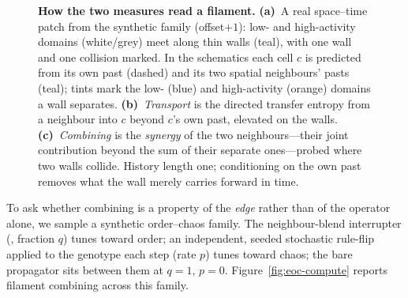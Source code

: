 \documentclass[man,12pt,floatsintext,donotrepeattitle]{apa7}
\newcommand{\secref}[1]{\emph{\nameref{#1}}}
\begin{document}
\begin{figure}[tb]
\caption{\textbf{How the two measures read a filament.} \textbf{(a)}~A real
space--time patch from the synthetic family (offset$+1$): low- and high-activity
domains (white/grey) meet along thin walls (teal), with one wall and one collision
marked. In the schematics each cell $c$ is predicted from its own past (dashed)
and its two spatial neighbours' pasts (teal); tints mark the low- (blue) and
high-activity (orange) domains a wall separates. \textbf{(b)}~\emph{Transport} is
the directed transfer entropy from a neighbour into $c$ beyond $c$'s own past,
elevated on the walls. \textbf{(c)}~\emph{Combining} is the \emph{synergy} of the
two neighbours---their joint contribution beyond the sum of their separate
ones---probed where two walls collide. History length one; conditioning on the
own past removes what the wall merely carries forward in time.}
\label{fig:eoc-schema}
\end{figure}

To ask whether combining is a property of the \emph{edge} rather than of the
operator alone, we sample a synthetic order--chaos family. The neighbour-blend
interrupter (\secref{sec:interrupter}, fraction $q$) tunes toward order; an
independent, seeded stochastic rule-flip applied to the genotype each step
(rate $p$) tunes toward chaos; the bare propagator sits between them at
$q=1,\,p=0$. Figure~\ref{fig:eoc-compute} reports filament combining across this
family.
\end{document}
